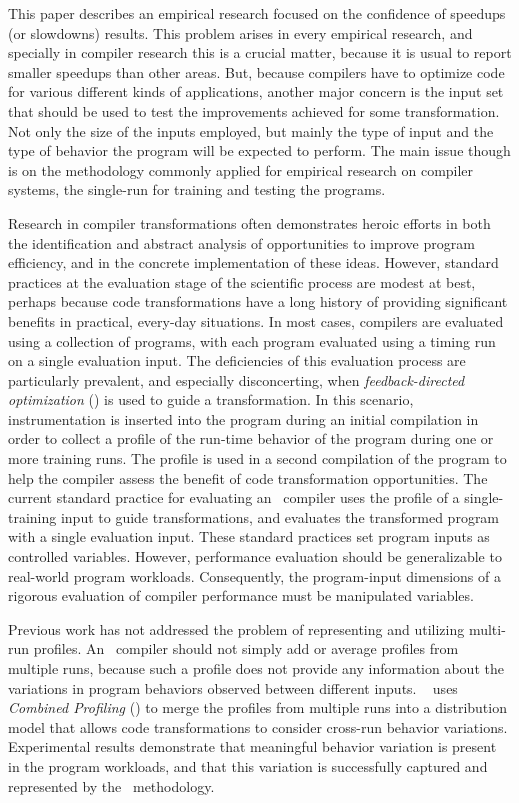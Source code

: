 
This paper describes an empirical research focused on the confidence of speedups (or slowdowns) results. This problem arises in every empirical research, and specially in compiler research this is a crucial matter, because it is usual to report smaller speedups than other areas. But, because compilers have to optimize code for various different kinds of applications, another major concern is the input set that should be used to test the improvements achieved for some transformation. Not only the size of the inputs employed, but mainly the type of input and the type of behavior the program will be expected to perform. The main issue though is on the methodology commonly applied for empirical research on compiler systems, the single-run for training and testing the programs.

Research in compiler transformations often demonstrates heroic efforts in both the identification and abstract analysis of opportunities to improve program efficiency, and in the concrete implementation of these ideas.  However, standard practices at the evaluation stage of the scientific process are modest at best, perhaps because code transformations have a long history of providing significant benefits in practical, every-day situations.  In most cases, compilers are evaluated using a collection of programs, with each program evaluated using a timing run on a single evaluation input.  The deficiencies of this evaluation process are particularly prevalent, and especially disconcerting, when {\it feedback-directed optimization} (\FDO) is used to guide a transformation.  In this scenario, instrumentation is inserted into the program during an initial compilation in order to collect a profile of the run-time behavior of the program during one or more training runs.  The profile is used in a second compilation of the program to help the compiler assess the benefit of code transformation opportunities.  The current standard practice for evaluating an \FDO\ compiler uses the profile of a single-training input to guide transformations, and evaluates the transformed program with a single evaluation input.  These standard practices set program inputs as controlled variables.  However, performance evaluation should be generalizable to real-world program workloads. Consequently, the program-input dimensions of a rigorous evaluation of compiler performance must be manipulated variables.


Previous work has not addressed the problem of representing and utilizing multi-run profiles.  An \FDO\ compiler should not simply add or average profiles from multiple runs, because such a profile does not provide any information about the variations in program behaviors observed between different inputs. ~\cite{BerubePhD} uses {\it Combined Profiling} (\CP) to merge the profiles from multiple runs into a distribution model that allows code transformations to consider cross-run behavior variations.  Experimental results demonstrate that meaningful behavior variation is present in the program workloads, and that this variation is successfully captured and represented by the \CP\ methodology.


